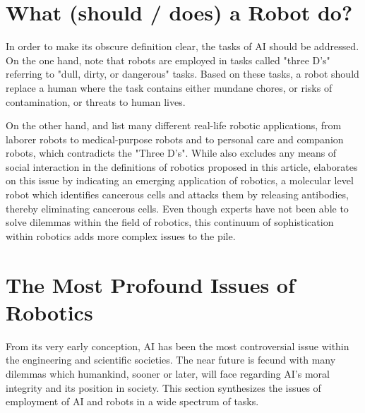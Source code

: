 \documentclass[man]{apa6}
\begin{document}
\section{What (should / does) a Robot do?}
In order to make its obscure definition clear, the tasks of AI should be addressed.
On the one hand,   note that robots are employed in tasks called "three D's" referring to "dull, dirty, or dangerous" tasks.
Based on these tasks, a robot should replace a human where the task contains either mundane chores, or risks of contamination, or threats to human lives.
\par 
\par
On the other hand,  and  list many different real-life robotic applications, from laborer robots to medical-purpose robots and to personal care and companion robots, which contradicts the "Three D's".
While  also excludes any means of social interaction in the definitions of robotics proposed in this article,  elaborates on this issue by indicating an emerging application of robotics, a molecular level robot which identifies cancerous cells and attacks them by releasing antibodies, thereby eliminating cancerous cells.
Even though experts have not been able to solve dilemmas within the field of robotics, this continuum of sophistication within robotics adds more complex issues to the pile.
\par
\section{The Most Profound Issues of Robotics}
From its very early conception, AI has been the most controversial issue within the engineering and scientific societies.
The near future is fecund with many dilemmas which humankind, sooner or later, will face regarding AI's moral integrity and its position in society.
This section synthesizes the issues of employment of AI and robots in a wide spectrum of tasks.
\end{document}
